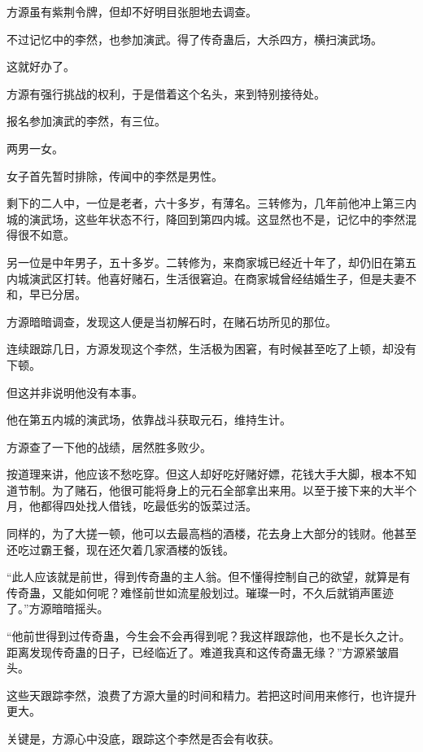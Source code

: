 
\begin{this_body}



方源虽有紫荆令牌，但却不好明目张胆地去调查。

不过记忆中的李然，也参加演武。得了传奇蛊后，大杀四方，横扫演武场。

这就好办了。

方源有强行挑战的权利，于是借着这个名头，来到特别接待处。

报名参加演武的李然，有三位。

两男一女。

女子首先暂时排除，传闻中的李然是男性。

剩下的二人中，一位是老者，六十多岁，有薄名。三转修为，几年前他冲上第三内城的演武场，这些年状态不行，降回到第四内城。这显然也不是，记忆中的李然混得很不如意。

另一位是中年男子，五十多岁。二转修为，来商家城已经近十年了，却仍旧在第五内城演武区打转。他喜好赌石，生活很窘迫。在商家城曾经结婚生子，但是夫妻不和，早已分居。

方源暗暗调查，发现这人便是当初解石时，在赌石坊所见的那位。

连续跟踪几日，方源发现这个李然，生活极为困窘，有时候甚至吃了上顿，却没有下顿。

但这并非说明他没有本事。

他在第五内城的演武场，依靠战斗获取元石，维持生计。

方源查了一下他的战绩，居然胜多败少。

按道理来讲，他应该不愁吃穿。但这人却好吃好赌好嫖，花钱大手大脚，根本不知道节制。为了赌石，他很可能将身上的元石全部拿出来用。以至于接下来的大半个月，他都得四处找人借钱，吃最低劣的饭菜过活。

同样的，为了大搓一顿，他可以去最高档的酒楼，花去身上大部分的钱财。他甚至还吃过霸王餐，现在还欠着几家酒楼的饭钱。

“此人应该就是前世，得到传奇蛊的主人翁。但不懂得控制自己的欲望，就算是有传奇蛊，又能如何呢？难怪前世如流星般划过。璀璨一时，不久后就销声匿迹了。”方源暗暗摇头。

“他前世得到过传奇蛊，今生会不会再得到呢？我这样跟踪他，也不是长久之计。距离发现传奇蛊的日子，已经临近了。难道我真和这传奇蛊无缘？”方源紧皱眉头。

这些天跟踪李然，浪费了方源大量的时间和精力。若把这时间用来修行，也许提升更大。

关键是，方源心中没底，跟踪这个李然是否会有收获。


\end{this_body}
